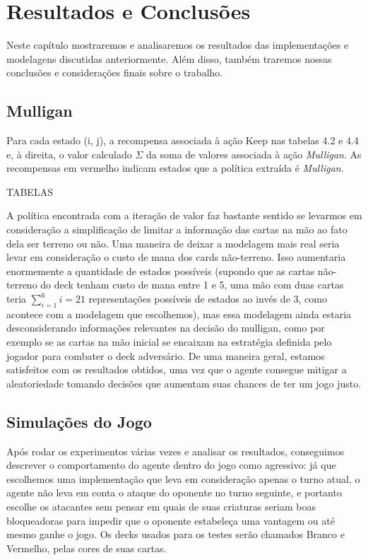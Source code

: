 \chapter{Resultados e Conclusões}
Neste capítulo mostraremos e analisaremos os resultados das implementações e modelagens discutidas anteriormente. Além disso, também traremos nossas conclusões e considerações finais sobre o trabalho.

\section{Mulligan}
Para cada estado (i, j), a recompensa associada à ação Keep nas tabelas 4.2 e 4.4 e, à direita, o valor
calculado $\Sigma$ da soma de valores associada à ação \textit{Mulligan}. As recompensas em vermelho indicam estados que a política extraída é \textit{Mulligan}.

TABELAS

A política encontrada com a iteração de valor faz bastante sentido se levarmos em consideração a simplificação de limitar a informação das cartas na mão ao fato dela ser terreno ou não. Uma maneira de deixar a modelagem mais real seria levar em consideração o custo de mana dos cards não-terreno. Isso aumentaria enormemente a quantidade de estados possíveis (supondo que as cartas não-terreno do deck tenham custo de mana entre 1 e 5, uma mão com duas cartas teria $\sum\limits_{i=1}^{6}i = 21$ representações possíveis de estados ao invés de 3, como acontece com a modelagem que escolhemos), mas essa modelagem ainda estaria desconsiderando informações relevantes na decisão do mulligan, como por exemplo se as cartas na mão inicial se encaixam na estratégia definida pelo jogador para combater o deck adversário. De uma maneira geral, estamos satisfeitos com os resultados obtidos, uma vez que o agente consegue mitigar a aleatoriedade tomando decisões que aumentam suas chances de ter um jogo justo.

\section{Simulações do Jogo}
Após rodar os experimentos várias vezes e analisar os resultados, conseguimos descrever o comportamento do agente dentro do jogo como agressivo: já que escolhemos uma implementação que leva em consideração apenas o turno atual, o agente não leva em conta o ataque do oponente no turno seguinte, e portanto escolhe os atacantes sem pensar em quais de suas criaturas seriam boas bloqueadoras para impedir que o oponente estabeleça uma vantagem ou até mesmo ganhe o jogo. Os decks usados para os testes serão chamados Branco e Vermelho, pelas cores de suas cartas.

